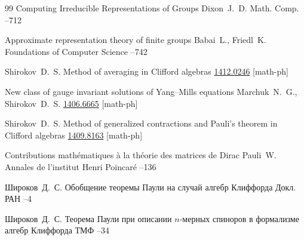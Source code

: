 \begin{thebibliography}{99}
\paper   Computing Irreducible Representations of Groups 
\by Dixon~J.~D.
\jour  Math. Comp.
--712 

\paper Approximate representation theory of finite groups
\by    Babai~L.,  Friedl~K.
\jour Foundations of Computer Science
--742 

\by Shirokov~D.~S.
\preprint Method of averaging in Clifford algebras
\arxiv \href{http://arxiv.org/abs/1412.0246}{1412.0246} [math-ph]



\preprint New class of gauge invariant solutions of Yang--Mills equations
\by Marchuk~N.~G., Shirokov~D.~S.
\arxiv \href{http://arxiv.org/abs/1406.6665}{1406.6665} [math-ph]


\by Shirokov~D.~S.
\preprint Method of generalized contractions and Pauli's theorem in Clifford algebras
\arxiv \href{http://arxiv.org/abs/1409.8163}{1409.8163} [math-ph]


\paper Contributions math\'ematiques \`a la th\'eorie des matrices de Dirac
\by    Pauli~W.
\jour Annales de l'institut Henri Poincar\'e 
--136




\by Широков~Д.~С.
\paper Обобщение теоремы Паули на случай алгебр Клиффорда
\jour Докл. РАН
–4  


\by Широков~Д.~С.
\paper Теорема Паули при описании $n$-мерных спиноров в формализме алгебр Клиффорда
\jour ТМФ
--34



\end{thebibliography}
